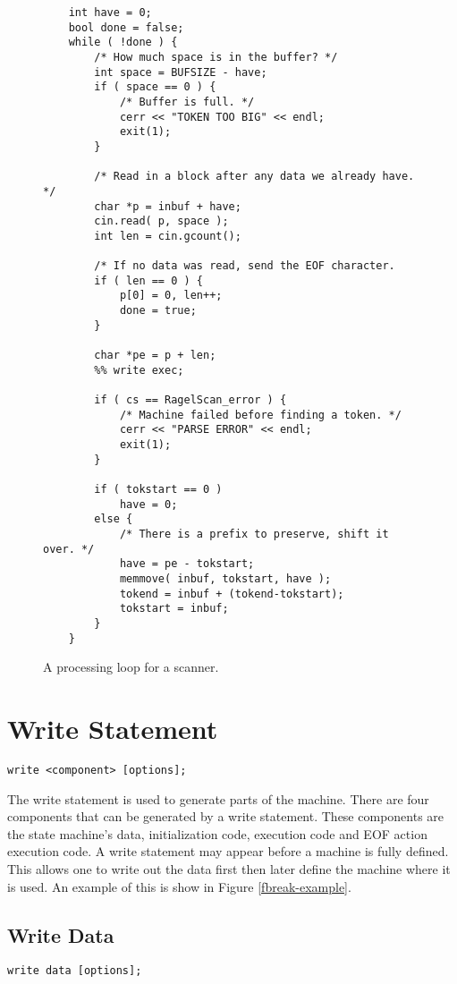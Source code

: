 \documentclass[letterpaper,11pt,oneside]{book}
\newcommand{\verbspace}{\vspace{10pt}}
\begin{document}
\begin{figure}
\small
\begin{verbatim}
    int have = 0;
    bool done = false;
    while ( !done ) {
        /* How much space is in the buffer? */
        int space = BUFSIZE - have;
        if ( space == 0 ) {
            /* Buffer is full. */
            cerr << "TOKEN TOO BIG" << endl;
            exit(1);
        }

        /* Read in a block after any data we already have. */
        char *p = inbuf + have;
        cin.read( p, space );
        int len = cin.gcount();

        /* If no data was read, send the EOF character.
        if ( len == 0 ) {
            p[0] = 0, len++;
            done = true;
        }

        char *pe = p + len;
        %% write exec;

        if ( cs == RagelScan_error ) {
            /* Machine failed before finding a token. */
            cerr << "PARSE ERROR" << endl;
            exit(1);
        }

        if ( tokstart == 0 )
            have = 0;
        else {
            /* There is a prefix to preserve, shift it over. */
            have = pe - tokstart;
            memmove( inbuf, tokstart, have );
            tokend = inbuf + (tokend-tokstart);
            tokstart = inbuf;
        }
    }
\end{verbatim}
\caption{A processing loop for a scanner.}
\label{scanner-loop}
\end{figure}


\section{Write Statement}
\label{write-statement}

\begin{verbatim}
write <component> [options];
\end{verbatim}
\verbspace


The write statement is used to generate parts of the machine. 
There are four
components that can be generated by a write statement. These components are the
state machine's data, initialization code, execution code and EOF action
execution code. A write statement may appear before a machine is fully defined.
This allows one to write out the data first then later define the machine where
it is used. An example of this is show in Figure \ref{fbreak-example}.

\subsection{Write Data}
\begin{verbatim}
write data [options];
\end{verbatim}
\verbspace
\end{document}
